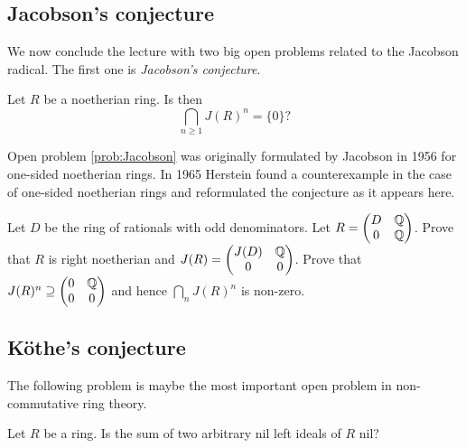 \subsection{Jacobson's conjecture}

We now conclude the lecture
with two big open problems related to the Jacobson radical. The first
one is \emph{Jacobson's conjecture}. 

\begin{problem}[Jacobson]
\label{prob:Jacobson}
Let $R$ be a noetherian ring. Is then 
\[
\bigcap_{n\geq1}J(R)^n=\{0\}?
\]
\end{problem}

Open problem \ref{prob:Jacobson} was originally formulated by Jacobson in 1956 \cite{MR0222106} 
for one-sided noetherian rings. In 1965 Herstein \cite{MR188253} found a counterexample
in the case of one-sided noetherian rings 
and reformulated the conjecture as it appears here. 

\begin{exercise}[Herstein]
Let $D$ be the ring of rationals with odd denominators. Let
$R=\begin{pmatrix}
    D & \mathbb{Q}\\
    0 & \mathbb{Q}
\end{pmatrix}$. Prove that $R$ is right noetherian and 
$J(R)=\begin{pmatrix}
J(D) & \mathbb{Q}\\
0 & 0
\end{pmatrix}$. Prove that 
$J(R)^n\supseteq\begin{pmatrix}0&\mathbb{Q}\\0&0\end{pmatrix}$ and hence $\bigcap_nJ(R)^n$ is non-zero. 
\end{exercise}

\subsection{K\"othe's conjecture}

The following problem is maybe the most important open 
problem in non-commutative ring theory. 

\begin{problem}[K\"othe]
\label{prob:Koethe}
Let $R$ be a ring. Is the sum 
of two arbitrary nil left ideals of $R$ nil?
\end{problem}

